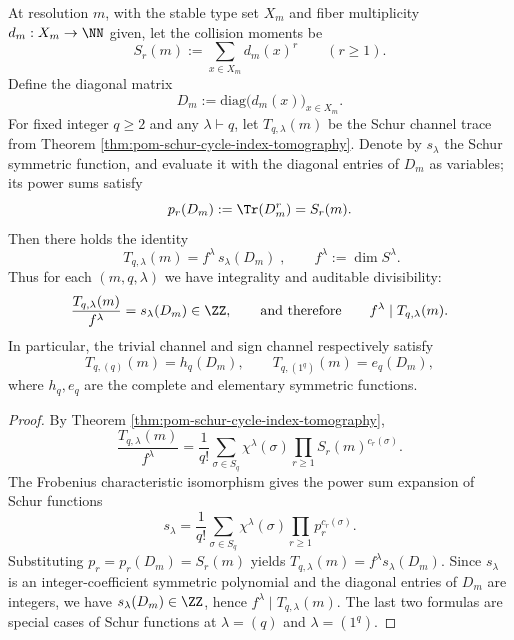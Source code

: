 \begin{corollary}\label{cor:pom-schur-trace-frobenius-character-identification}
At resolution \(m\), with the stable type set \(X_m\) and fiber multiplicity \(d_m:X_m\to\NN\) given, let the collision moments be
\[
S_r(m):=\sum_{x\in X_m} d_m(x)^r\qquad(r\ge 1).
\]
Define the diagonal matrix
\[
D_m:=\mathrm{diag}\bigl(d_m(x)\bigr)_{x\in X_m}.
\]
For fixed integer \(q\ge 2\) and any \(\lambda\vdash q\), let \(T_{q,\lambda}(m)\) be the Schur channel trace from Theorem \ref{thm:pom-schur-cycle-index-tomography}.
Denote by \(s_\lambda\) the Schur symmetric function, and evaluate it with the diagonal entries of \(D_m\) as variables; its power sums satisfy
\[
p_r(D_m):=\Tr(D_m^r)=S_r(m).
\]
Then there holds the identity
\[
\boxed{\;
T_{q,\lambda}(m)=f^\lambda\, s_\lambda(D_m)\; } ,
\qquad f^\lambda:=\dim S^\lambda.
\]
Thus for each \((m,q,\lambda)\) we have integrality and auditable divisibility:
\[
\frac{T_{q,\lambda}(m)}{f^\lambda}=s_\lambda(D_m)\in\ZZ,
\qquad\text{and therefore}\qquad
f^\lambda\mid T_{q,\lambda}(m).
\]
In particular, the trivial channel and sign channel respectively satisfy
\[
T_{q,(q)}(m)=h_q(D_m),\qquad
T_{q,(1^q)}(m)=e_q(D_m),
\]
where \(h_q,e_q\) are the complete and elementary symmetric functions.
\end{corollary}
\begin{proof}
By Theorem \ref{thm:pom-schur-cycle-index-tomography},
\[
\frac{T_{q,\lambda}(m)}{f^\lambda}
=\frac{1}{q!}\sum_{\sigma\in S_q}\chi^\lambda(\sigma)\prod_{r\ge 1}S_r(m)^{c_r(\sigma)}.
\]
The Frobenius characteristic isomorphism gives the power sum expansion of Schur functions
\[
s_\lambda=\frac{1}{q!}\sum_{\sigma\in S_q}\chi^\lambda(\sigma)\prod_{r\ge 1}p_r^{c_r(\sigma)}.
\]
Substituting \(p_r=p_r(D_m)=S_r(m)\) yields \(T_{q,\lambda}(m)=f^\lambda s_\lambda(D_m)\).
Since \(s_\lambda\) is an integer-coefficient symmetric polynomial and the diagonal entries of \(D_m\) are integers, we have \(s_\lambda(D_m)\in\ZZ\), hence \(f^\lambda\mid T_{q,\lambda}(m)\).
The last two formulas are special cases of Schur functions at \(\lambda=(q)\) and \(\lambda=(1^q)\).
\end{proof}

